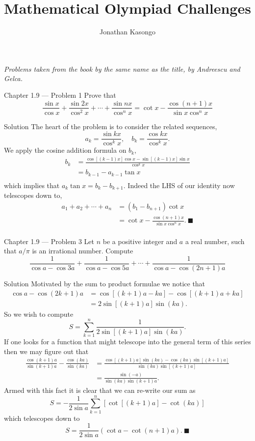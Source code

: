 \documentclass{article}
\author{Jonathan Kasongo}
\title{Mathematical Olympiad Challenges}
\begin{document}
\maketitle
\textit{Problems taken from the book by the same name as the title, by
Andreescu and Gelca.}

\begin{problem}{Chapter 1.9 --- Problem 1}
Prove that
$$
\frac{\sin x}{\cos x} + \frac{\sin 2x}{\cos^2 x} + \cdots +
\frac{\sin nx}{\cos^n x} = \cot x - \frac{\cos (n+1)x}{\sin x \cos^n x}
$$
\end{problem}

\begin{solution}{Solution}
The heart of the problem is to consider the related sequences,
$$
a_k = \frac{\sin kx}{\cos^k x}, \quad b_k = \frac{\cos kx}{\cos^k x}.
$$
We apply the cosine addition formula on $b_k$,
\[
\begin{aligned}
b_k &= \frac{\cos [(k-1)x] \cos x - \sin [(k-1)x] \sin x}{\cos^k x}\\
&= b_{k-1} - a_{k-1} \tan x\\
\end{aligned}
\]
which implies that $a_{k} \tan x = b_k - b_{k+1}$.
Indeed the LHS of our identity now telescopes down to,
\[
\begin{aligned}
a_1 + a_2 + \cdots + a_n &= (b_1 - b_{n+1})\cot x\\
&= \cot x - \frac{\cos (n+1)x}{\sin x \cos^n x}. \ \blacksquare \\
\end{aligned}
\]
\end{solution}
\newpage

\begin{problem}{Chapter 1.9 --- Problem 3}
Let $n$ be a positive integer and $a$ a real number, such that $a/\pi$ is
an irrational number. Compute
$$
\frac{1}{\cos a - \cos 3a} + \frac{1}{\cos a - \cos 5a} + \cdots +
\frac{1}{\cos a - \cos (2n+1)a}
$$
\end{problem}

\begin{solution}{Solution}
Motivated by the sum to product formulae we notice that
\[
\begin{aligned}
\cos a - \cos (2k+1)a &= \cos [(k+1)a - ka] - \cos [(k+1)a + ka] \\
&= 2\sin [(k+1)a] \sin (ka).
\end{aligned}
\]
So we wish to compute
$$
S = \sum_{k=1}^n \frac{1}{2\sin [(k+1)a] \sin(ka)}.
$$
If one looks for a function that might telescope into the general term of
this series then we may figure out that
\[
\begin{aligned}
\frac{\cos(k+1)a}{\sin(k+1)a} - \frac{\cos(ka)}{\sin(ka)} &=
\frac{\cos[(k+1)a] \sin(ka) - \cos(ka) \sin[(k+1)a]}{\sin(ka)\sin[(k+1)a]}\\
&= \frac{\sin(-a)}{\sin(ka)\sin(k+1)a}.
\end{aligned}
\]
Armed with this fact it is clear that we can re-write our sum as
$$
S = -\frac{1}{2\sin a} \sum_{k=1}^n [\cot[(k+1)a] - \cot (ka)]
$$
which telescopes down to
$$
S = \frac{1}{2\sin a}(\cot a - \cot (n+1)a). \ \blacksquare
$$
\end{solution}
\newpage
\end{document}
